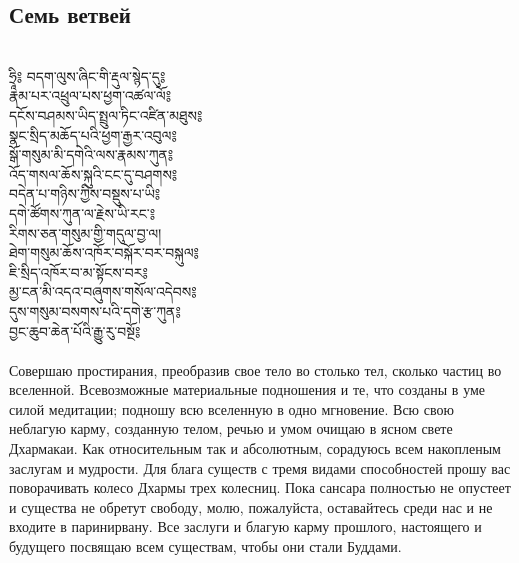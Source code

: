 \subsection{Семь ветвей}
\\
\ti
ཧྲཱི༔ བདག་ལུས་ཞིང་གི་རྡུལ་སྙེད་དུ༔\\
རྣམ་པར་འཕྲུལ་པས་ཕྱག་འཚལ་ལོ༔\\
དངོས་བཤམས་ཡིད་སྤྲུལ་ཏིང་འཛིན་མཐུས༔\\
སྣང་སྲིད་མཆོད་པའི་ཕྱག་རྒྱར་འབུལ༔\\
སྒོ་གསུམ་མི་དགེའི་ལས་རྣམས་ཀུན༔\\
འོད་གསལ་ཆོས་སྐུའི་ངང་དུ་བཤགས༔\\
བདེན་པ་གཉིས་ཀྱིས་བསྡུས་པ་ཡི༔\\
དགེ་ཚོགས་ཀུན་ལ་རྗེས་ཡི་རང་༔\\
རིགས་ཅན་གསུམ་གྱི་གདུལ་བྱ་ལ།\\
ཐེག་གསུམ་ཆོས་འཁོར་བསྐོར་བར་བསྐུལ༔\\
ཇི་སྲིད་འཁོར་བ་མ་སྟོངས་བར༔ \\
མྱ་ངན་མི་འདའ་བཞུགས་གསོལ་འདེབས༔ \\
དུས་གསུམ་བསགས་པའི་དགེ་རྩ་ཀུན༔ \\
བྱང་ཆུབ་ཆེན་པོའི་རྒྱུ་རུ་བསྔོ༔ \\
\\
\ru
Совершаю простирания, преобразив свое тело во столько тел, сколько частиц во вселенной.
Всевозможные материальные подношения и те, что созданы в уме силой медитации;
подношу всю вселенную в одно мгновение.
Всю свою неблагую карму, созданную телом, речью и умом
очищаю в ясном свете Дхармакаи.
Как относительным так и абсолютным,
сорадуюсь всем накопленым заслугам и мудрости.
Для блага существ с тремя видами способностей
прошу вас  поворачивать колесо Дхармы трех колесниц.
Пока сансара полностью не опустеет и существа не обретут свободу,
молю, пожалуйста, оставайтесь среди нас и не входите в паринирвану.
Все заслуги и благую карму прошлого, настоящего и будущего
посвящаю всем существам, чтобы они стали Буддами.
\newpage
